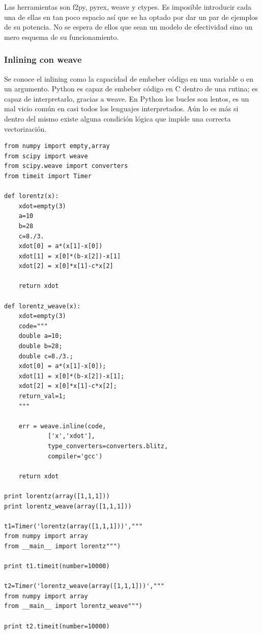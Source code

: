 \documentclass[10pt,letterpaper,conference]{ieeeconfspanish}
\begin{document}
Las herramientas son f2py, pyrex, weave y ctypes.  Es imposible
introducir cada una de ellas en tan poco espacio así que se ha optado
por dar un par de ejemplos de su potencia. No se espera de ellos que
sean un modelo de efectividad sino un mero esquema de su
funcionamiento.

\subsubsection*{Inlining con weave}

Se conoce el inlining como la capacidad de embeber código en una
variable o en un argumento.  Python es capaz de embeber código en C
dentro de una rutina; es capaz de interpretarlo, gracias a weave.  En
Python los bucles son lentos, es un mal vicio común en casi todos los
lenguajes interpretados.  Aún lo es más si dentro del mismo existe
alguna condición lógica que impide una correcta vectorización.

\begin{footnotesize}
\begin{verbatim}
from numpy import empty,array
from scipy import weave
from scipy.weave import converters
from timeit import Timer

def lorentz(x):
    xdot=empty(3)
    a=10
    b=28
    c=8./3.
    xdot[0] = a*(x[1]-x[0])
    xdot[1] = x[0]*(b-x[2])-x[1]
    xdot[2] = x[0]*x[1]-c*x[2]

    return xdot

def lorentz_weave(x):
    xdot=empty(3)
    code="""
    double a=10;
    double b=28;
    double c=8./3.;
    xdot[0] = a*(x[1]-x[0]);
    xdot[1] = x[0]*(b-x[2])-x[1];
    xdot[2] = x[0]*x[1]-c*x[2];
    return_val=1;
    """

    err = weave.inline(code,
            ['x','xdot'],
            type_converters=converters.blitz,
            compiler='gcc')

    return xdot

print lorentz(array([1,1,1]))
print lorentz_weave(array([1,1,1]))

t1=Timer('lorentz(array([1,1,1]))',"""
from numpy import array
from __main__ import lorentz""")

print t1.timeit(number=10000)

t2=Timer('lorentz_weave(array([1,1,1]))',"""
from numpy import array
from __main__ import lorentz_weave""")

print t2.timeit(number=10000)
\end{verbatim}
\end{footnotesize}
\end{document}
